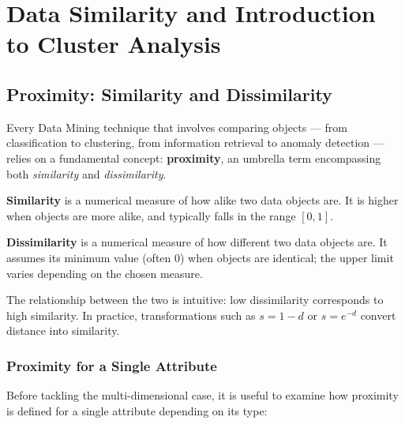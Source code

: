 \chapter{Data Similarity and Introduction to Cluster Analysis}
\label{ch:similarity-clustering}


\section{Proximity: Similarity and Dissimilarity}
\label{sec:proximity}

Every Data Mining technique that involves comparing objects — from classification to clustering, from information retrieval to anomaly detection — relies on a fundamental concept: \textbf{proximity}, an umbrella term encompassing both \textit{similarity} and \textit{dissimilarity}.

\begin{definition}[Similarity]
\textbf{Similarity} is a numerical measure of how alike two data objects are. It is higher when objects are more alike, and typically falls in the range $[0, 1]$.
\end{definition}

\begin{definition}[Dissimilarity]
\textbf{Dissimilarity} is a numerical measure of how different two data objects are. It assumes its minimum value (often $0$) when objects are identical; the upper limit varies depending on the chosen measure.
\end{definition}

The relationship between the two is intuitive: low dissimilarity corresponds to high similarity. In practice, transformations such as $s = 1 - d$ or $s = e^{-d}$ convert distance into similarity.

\subsection{Proximity for a Single Attribute}

Before tackling the multi-dimensional case, it is useful to examine how proximity is defined for a single attribute depending on its type:

